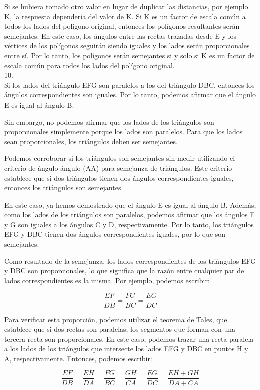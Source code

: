 \documentclass{article}
\begin{document}
Si se hubiera tomado otro valor en lugar de duplicar las distancias, por ejemplo K, la respuesta dependería del valor de K. Si K es un factor de escala común a todos los lados del polígono original, entonces los polígonos resultantes serán semejantes. En este caso, los ángulos entre las rectas trazadas desde E y los vértices de los polígonos seguirán siendo iguales y los lados serán proporcionales entre sí. Por lo tanto, los polígonos serán semejantes si y solo si K es un factor de escala común para todos los lados del polígono original.
\\
{\Large 10.}
\\
Si los lados del triángulo EFG son paralelos a los del triángulo DBC, entonces los ángulos correspondientes son iguales. Por lo tanto, podemos afirmar que el ángulo E es igual al ángulo B.

Sin embargo, no podemos afirmar que los lados de los triángulos son proporcionales simplemente porque los lados son paralelos. Para que los lados sean proporcionales, los triángulos deben ser semejantes.

Podemos corroborar si los triángulos son semejantes sin medir utilizando el criterio de ángulo-ángulo (AA) para semejanza de triángulos. Este criterio establece que si dos triángulos tienen dos ángulos correspondientes iguales, entonces los triángulos son semejantes.

En este caso, ya hemos demostrado que el ángulo E es igual al ángulo B. Además, como los lados de los triángulos son paralelos, podemos afirmar que los ángulos F y G son iguales a los ángulos C y D, respectivamente. Por lo tanto, los triángulos EFG y DBC tienen dos ángulos correspondientes iguales, por lo que son semejantes.

Como resultado de la semejanza, los lados correspondientes de los triángulos EFG y DBC son proporcionales, lo que significa que la razón entre cualquier par de lados correspondientes es la misma. Por ejemplo, podemos escribir:

$$\frac{EF}{DB} = \frac{FG}{BC} = \frac{EG}{DC}$$

Para verificar esta proporción, podemos utilizar el teorema de Tales, que establece que si dos rectas son paralelas, los segmentos que forman con una tercera recta son proporcionales. En este caso, podemos trazar una recta paralela a los lados de los triángulos que intersecte los lados EFG y DBC en puntos H y A, respectivamente. Entonces, podemos escribir:

$$\frac{EF}{DB} = \frac{EH}{DA} = \frac{FG}{BC} = \frac{GH}{CA} = \frac{EG}{DC} = \frac{EH+GH}{DA+CA}$$
\end{document}
